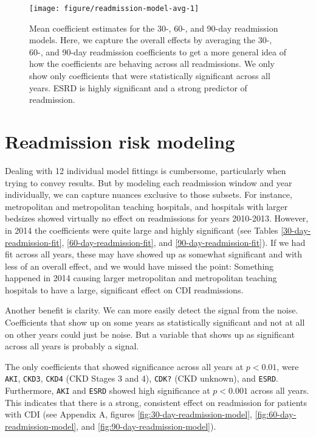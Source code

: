 \documentclass[12pt]{ociamthesis}\usepackage[]{graphicx}\usepackage[]{color}
\newenvironment{knitrout}{}{} %
\begin{document}
\begin{knitrout}
\color{fgcolor}\begin{figure}

{\centering \texttt{[image: figure/readmission-model-avg-1]} 

}

\caption[Mean coefficient estimates for the 30-, 60-, and 90-day readmission models]{Mean coefficient estimates for the 30-, 60-, and 90-day readmission models. Here, we capture the overall effects by averaging the 30-, 60-, and 90-day readmission coefficients to get a more general idea of how the coefficients are behaving across all readmissions. We only show only coefficients that were statistically significant across all years. ESRD is highly significant and a strong predictor of readmission.}\label{fig:readmission-model-avg}
\end{figure}


\end{knitrout}
\label{fig:readmission-model-avg}

\section{Readmission risk modeling}

Dealing with 12 individual model fittings is cumbersome, particularly when trying to convey results.
But by modeling each readmission window and year individually, we can capture nuances exclusive to those subsets.
For instance, metropolitan and metropolitan teaching hospitals, and hospitals with larger bedsizes showed virtually no effect on readmissions for years 2010-2013. 
However, in 2014 the coefficients were quite large and highly significant (see Tables \ref{30-day-readmission-fit}, \ref{60-day-readmission-fit}, and \ref{90-day-readmission-fit}).
If we had fit across all years, these may have showed up as somewhat significant and with less of an overall effect, and we would have missed the point:
Something happened in 2014 causing larger metropolitan and metropolitan teaching hospitals to have a large, significant effect on CDI readmissions. 

Another benefit is clarity. We can more easily detect the signal from the noise. Coefficients that show up on some years as statistically significant and not at all
on other years could just be noise. But a variable that shows up as significant across all years is probably a signal. 

The only coefficients that showed significance across all years at $p < 0.01$, were \texttt{AKI}, \texttt{CKD3}, \texttt{CKD4} (CKD Stages 3 and 4), 
\texttt{CDK?} (CKD unknown), and \texttt{ESRD}. Furthermore, \texttt{AKI} and \texttt{ESRD} showed high significance at $p < 0.001$ across all years.
This indicates that there is a strong, consistent effect on readmission for patients with CDI
(see Appendix A, figures \ref{fig:30-day-readmission-model}, \ref{fig:60-day-readmission-model}, and \ref{fig:90-day-readmission-model}).
\end{document}
